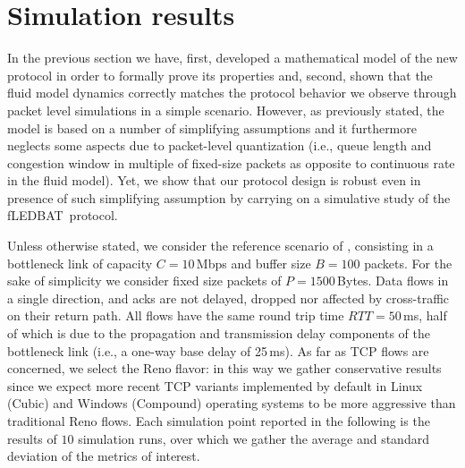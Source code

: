 \documentclass[conference]{IEEEtran}
\newcommand{\figLC}[2]{
        \caption{#2}
        \label{fig:#1}
        \vspace{-5pt}
}
\newcommand{\fledbat}[0]{fLEDBAT}
\begin{document}
\section{Simulation results}\label{sec:simulation}
\begin{figure*}[t]
    \begin{center}
        \figLC{time}{Time evolution of \fledbat\ dynamics with (a) chunk-based $\zeta=0.01$ and (b) backlogged $\zeta=5$ traffic models.}
    \end{center}
\vspace{-4mm}
\end{figure*}


In the previous section we have, first, developed a mathematical model of the
new protocol in order to formally prove its properties and, second, shown that the fluid model dynamics correctly matches the protocol behavior we observe through packet level simulations in a simple scenario.
However, as previously stated, the model is based on a number of simplifying assumptions
and it furthermore neglects some aspects due to packet-level quantization (i.e., queue length and congestion window in multiple of fixed-size packets as opposite to continuous rate in the fluid model). Yet, we show that our protocol design is robust even in presence of such simplifying assumption by carrying on a simulative study of the \fledbat\ protocol.


Unless otherwise stated, we consider the reference scenario of \cite{icccn10}, consisting in a bottleneck link of capacity $C=10$\,Mbps and buffer size $B=100$ packets. For the sake of simplicity we consider fixed size packets of $P=1500$\,Bytes. Data flows in a single direction, and acks are not delayed, dropped nor affected by cross-traffic on their return path.  All flows have the same round trip time $RTT=50$\,ms, half of which is due to the propagation and transmission delay components of the bottleneck link (i.e., a one-way  base delay of 25\,ms). As far as TCP flows are concerned, we select the Reno flavor: in this way we gather conservative results since  we expect more recent TCP variants implemented by default in Linux (Cubic) and Windows (Compound) operating systems to be more aggressive than traditional Reno flows.
Each simulation point reported in the following is the results of $10$ simulation runs, over which we gather the average and standard deviation of the metrics of interest.
\end{document}
